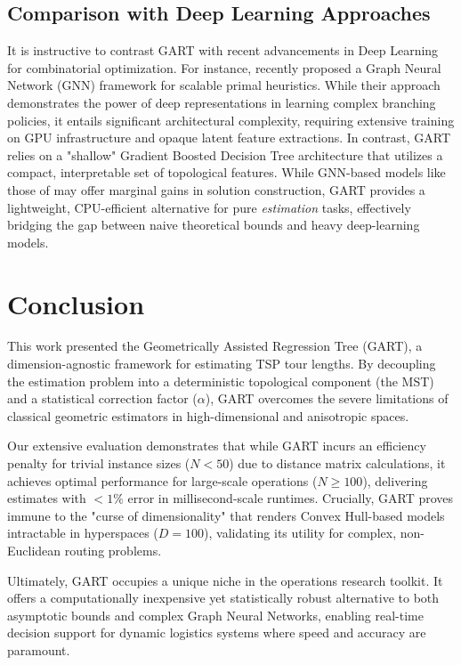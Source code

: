 \documentclass{article}
\begin{document}
\subsection{Comparison with Deep Learning Approaches}
It is instructive to contrast GART with recent advancements in Deep Learning for combinatorial optimization. For instance, \citet{canturk2024scalable} recently proposed a Graph Neural Network (GNN) framework for scalable primal heuristics. While their approach demonstrates the power of deep representations in learning complex branching policies, it entails significant architectural complexity, requiring extensive training on GPU infrastructure and opaque latent feature extractions. In contrast, GART relies on a "shallow" Gradient Boosted Decision Tree architecture that utilizes a compact, interpretable set of topological features. While GNN-based models like those of \citet{canturk2024scalable} may offer marginal gains in solution construction, GART provides a lightweight, CPU-efficient alternative for pure \textit{estimation} tasks, effectively bridging the gap between naive theoretical bounds and heavy deep-learning models.

\section{Conclusion}\label{sec:conclusion}

This work presented the Geometrically Assisted Regression Tree (GART), a dimension-agnostic framework for estimating TSP tour lengths. By decoupling the estimation problem into a deterministic topological component (the MST) and a statistical correction factor ($\alpha$), GART overcomes the severe limitations of classical geometric estimators in high-dimensional and anisotropic spaces.

Our extensive evaluation demonstrates that while GART incurs an efficiency penalty for trivial instance sizes ($N < 50$) due to distance matrix calculations, it achieves optimal performance for large-scale operations ($N \ge 100$), delivering estimates with $<1\%$ error in millisecond-scale runtimes. Crucially, GART proves immune to the "curse of dimensionality" that renders Convex Hull-based models intractable in hyperspaces ($D=100$), validating its utility for complex, non-Euclidean routing problems.

Ultimately, GART occupies a unique niche in the operations research toolkit. It offers a computationally inexpensive yet statistically robust alternative to both asymptotic bounds and complex Graph Neural Networks, enabling real-time decision support for dynamic logistics systems where speed and accuracy are paramount.

  
  
\end{document}
